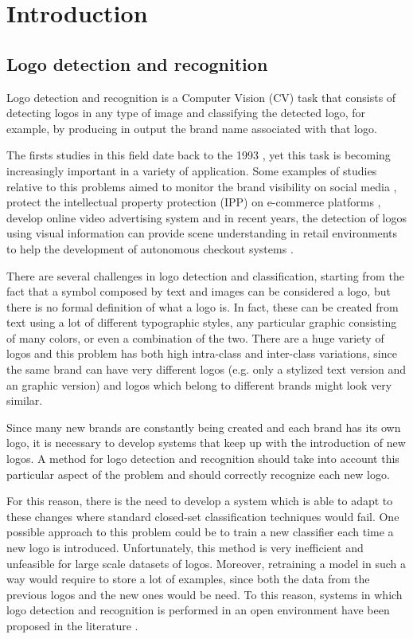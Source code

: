 \chapter{Introduction}
\label{chap:introduction}

\section{Logo detection and recognition}

Logo detection and recognition is a Computer Vision (CV) task that consists of detecting logos in any type of image and classifying the detected logo, for example, by producing in output the brand name associated with that logo. 

The firsts studies in this field date back to the 1993 \cite{doermann1993logo}, yet this task is becoming increasingly important in a variety of application. Some examples of studies relative to this problems aimed to monitor the brand visibility on social media \cite{7492197}, protect the intellectual property protection (IPP) on e-commerce platforms \cite{jin2020open}, develop online video advertising system \cite{cheng2017video} and in recent years, the detection of logos using visual information can provide scene understanding in retail environments to help the development of autonomous checkout systems \cite{mata2022standardsim}.

There are several challenges in logo detection and classification, starting from the fact that a symbol composed by text and images can be considered a logo, but there is no formal definition of what a logo is. In fact, these can be created from text using a lot of different typographic styles, any particular graphic consisting of many colors, or even a combination of the two.
There are a huge variety of logos and this problem has both high intra-class and inter-class variations, since the same brand can have very different logos (e.g. only a stylized text version and an graphic version) and logos which belong to different brands might look very similar.

Since many new brands are constantly being created and each brand has its own logo, it is necessary to develop systems that keep up with the introduction of new logos. A method for logo detection and recognition should take into account this particular aspect of the problem and should correctly recognize each new logo.

For this reason, there is the need to develop a system which is able to adapt to these changes where standard closed-set classification techniques would fail. One possible approach to this problem could be to train a new classifier each time a new logo is introduced. Unfortunately, this method is very inefficient and unfeasible for large scale datasets of logos. Moreover, retraining a model in such a way would require to store a lot of examples, since both the data from the previous logos and the new ones would be need. To this reason, systems in which logo detection and recognition is performed in an open environment have been proposed in the literature \cite{fehervari2019scalable,li2022seetek}.

